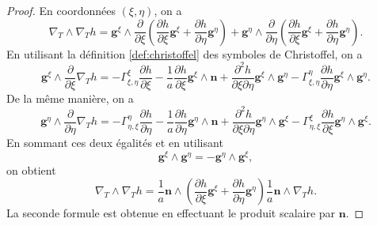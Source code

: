 \begin{proof}
En coordonnées $(\xi, \eta)$, on a
\begin{equation}
\nabla_T \wedge \nabla_T h = \mathbf{g}^{\xi} \wedge \dfrac{\partial}{\partial \xi} \left( \dfrac{\partial h}{\partial \xi} \mathbf{g}^{\xi} + \dfrac{\partial h}{\partial \eta} \mathbf{g}^{\eta}\right) + \mathbf{g}^{\eta} \wedge \dfrac{\partial}{\partial \eta} \left( \dfrac{\partial h}{\partial \xi} \mathbf{g}^{\xi} + \dfrac{\partial h}{\partial \eta} \mathbf{g}^{\eta}\right).
\end{equation}
En utilisant la définition \ref{def:christoffel} des symboles de Christoffel, on a
\begin{equation}
\mathbf{g}^{\xi} \wedge \dfrac{\partial}{\partial \xi}\nabla_T h = - \Gamma_{\xi,\eta}^{\xi} \dfrac{\partial h}{\partial \xi} - \dfrac{1}{a} \dfrac{\partial h}{\partial \xi} \mathbf{g}^{\xi} \wedge \mathbf{n} + \dfrac{\partial^2 h}{\partial \xi \partial \eta} \mathbf{g}^{\xi} \wedge \mathbf{g}^{\eta} - \Gamma_{\xi, \eta}^{\eta} \dfrac{\partial h}{\partial \eta} \mathbf{g}^{\xi} \wedge \mathbf{g}^{\eta}.
\end{equation}
De la même manière, on a
\begin{equation}
\mathbf{g}^{\eta} \wedge \dfrac{\partial}{\partial \eta}\nabla_T h = - \Gamma_{\eta,\xi}^{\eta} \dfrac{\partial h}{\partial \eta} - \dfrac{1}{a} \dfrac{\partial h}{\partial \eta} \mathbf{g}^{\eta} \wedge \mathbf{n} + \dfrac{\partial^2 h}{\partial \xi \partial \eta} \mathbf{g}^{\eta} \wedge \mathbf{g}^{\xi} - \Gamma_{\eta, \xi}^{\xi} \dfrac{\partial h}{\partial \xi} \mathbf{g}^{\eta} \wedge \mathbf{g}^{\xi}.
\end{equation}
En sommant ces deux égalités et en utilisant
\begin{equation}
\mathbf{g}^{\xi} \wedge \mathbf{g}^{\eta} = -\mathbf{g}^{\eta} \wedge \mathbf{g}^{\xi},
\end{equation}
on obtient
\begin{equation}
\nabla_T \wedge \nabla_T h = \dfrac{1}{a} \mathbf{n} \wedge \left( \dfrac{\partial h}{\partial \xi} \mathbf{g}^{\xi} + \dfrac{\partial h}{\partial \eta} \mathbf{g}^{\eta} \right) \dfrac{1}{a} \mathbf{n} \wedge \nabla_T h.
\end{equation}
La seconde formule est obtenue en effectuant le produit scalaire par $\mathbf{n}$.
\end{proof}

